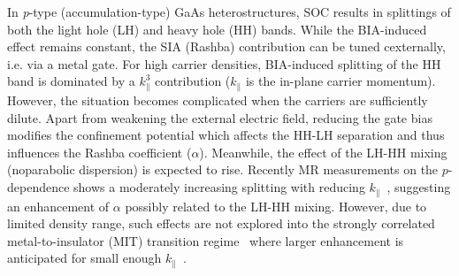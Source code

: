 \documentclass[twocolumn,secnumarabic,amssymb, nobibnotes, aps, prd]{revtex4-1}
\begin{document}
In {\it p}-type (accumulation-type) GaAs heterostructures, SOC results in splittings of both the light hole (LH) and heavy hole (HH) bands. While the BIA-induced effect remains constant, the SIA (Rashba) contribution can be tuned cexternally, i.e. via a metal gate. For high carrier densities, BIA-induced splitting of the HH band is dominated by a $k_{\parallel}^3$ contribution ($k_{\parallel}$ is the in-plane carrier momentum). However, the situation becomes complicated when the carriers are sufficiently dilute. Apart from weakening the external electric field, reducing the gate bias modifies the confinement potential which affects the HH-LH separation and thus influences the Rashba coefficient ($\alpha$). Meanwhile, the effect of the LH-HH mixing (noparabolic dispersion) is expected to rise. Recently MR measurements on the $p$-dependence shows a moderately increasing splitting with reducing $k_{\parallel}$~\cite{Winkler2}, suggesting an enhancement of $\alpha$ possibly related to the LH-HH mixing. However, due to limited density range, such effects are not explored into the strongly correlated metal-to-insulator (MIT) transition regime~\cite{pudalovSOC} where larger enhancement is anticipated for small enough $k_{\parallel}$~\cite{Utah}.
 
\end{document}

